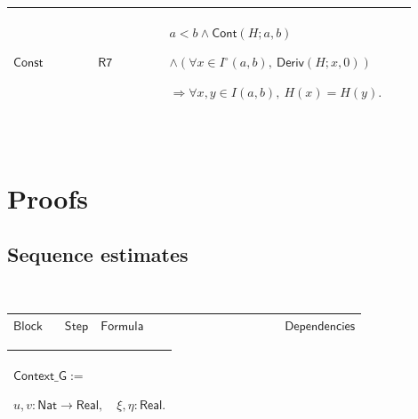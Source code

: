 \documentclass[12pt,reqno]{amsart}
\theoremstyle{blueplain}
\numberwithin{equation}{section}
\newlength{\FTCOneColumnBody}
\begin{document}
{\scriptsize \setlength{\parskip}{0pt}\nointerlineskip
\noindent 
\begin{tabular}{|@{}>{\centering\arraybackslash}m{0.19251\linewidth}|>{\centering\arraybackslash}m{0.16845\linewidth}|>{\centering\arraybackslash}m{0.53904\linewidth}|}
\hline
\hypertarget{lem:Const}{$\displaystyle \mathsf{Const}$} & \hyperlink{proof:R7}%
{$\displaystyle \mathsf{R7}$} & $\displaystyle a<b\land\mathsf{Cont}(H;a,b)$%
\par$\displaystyle \land(\forall x\in I^\circ(a,b),\ \mathsf{Deriv}(H;x,0))$%
\par$\displaystyle \Rightarrow\forall x,y\in I(a,b),\ H(x)=H(y).$ \\ \hline
\end{tabular}%
}

{\scriptsize \ }

\section{\protect\scriptsize Proofs}

\subsection{\protect\scriptsize Sequence estimates}

{\scriptsize {\ }}

{\scriptsize \setlength{\parskip}{0pt}\nointerlineskip
\noindent 
\begin{tabular}{|@{}>{\centering\arraybackslash}m{\FTCOneColumnBody}|}
\hline
$\displaystyle \mathsf{SequenceEstimates}$ \\ \hline
\end{tabular}%
}

{\scriptsize \setlength{\parskip}{0pt}\nointerlineskip
\noindent 
\begin{tabular}{|@{}>{\centering\arraybackslash}m{0.10658\linewidth}|>{\centering\arraybackslash}m{0.03553\linewidth}|>{\centering\arraybackslash}m{0.52105\linewidth}|>{\centering\arraybackslash}m{0.23684\linewidth}|}
\hline
$\displaystyle \mathsf{Block}$ & $\displaystyle \mathsf{Step}$ & $%
\displaystyle \mathsf{Formula}$ & $\displaystyle \mathsf{Dependencies}$ \\ 
\hline
\end{tabular}%
}

{\scriptsize \setlength{\parskip}{0pt}\nointerlineskip
\noindent 
\begin{tabular}{|@{}>{\centering\arraybackslash}m{\FTCOneColumnBody}|}
\hline
$\displaystyle \mathsf{Context\_G}:=$\par$\displaystyle u,v:\mathsf{Nat}\to%
\mathsf{Real},\quad\xi,\eta:\mathsf{Real}.$ \\ \hline
\end{tabular}%
}
\end{document}
